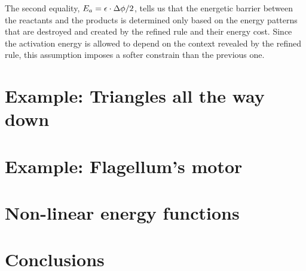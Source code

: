 The second equality, $E_a = \epsilon \cdot \Delta\phi/2$,
tells us that the energetic barrier between
the reactants and the products is determined
only based on the energy patterns
that are destroyed and created by the refined rule %
and their energy cost.
Since the activation energy is allowed to depend
on the context revealed by the refined rule,
this assumption imposes a softer constrain
than the previous one.




\section{Example: Triangles all the way down}
\label{sec:triangles}





\section{Example: Flagellum's motor}
\label{sec:alloring}


\section{Non-linear energy functions}
\label{sec:non-linear-energy}


\section{Conclusions}
\label{sec:direct-conclusions}




